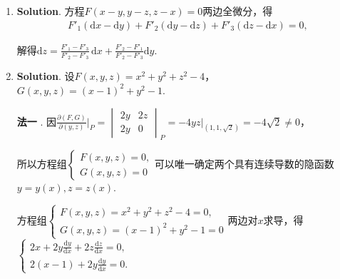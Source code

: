 \documentclass[../Main.tex]{subfiles}
\begin{document}
\begin{enumerate}
          平行六面体$\overrightarrow{PQ}\boldsymbol{s}_{1}\boldsymbol{s}_{2}$的体积$V
              =\left|\overrightarrow{PQ}\cdot (\boldsymbol{s}_{1}\times \boldsymbol{s}_{2}
              )\right|=\left|
              \begin{vmatrix}
                  1 & 1  & 2 \\
                  1 & -1 & 1 \\
                  1 & 3  & 4
              \end{vmatrix}\right|=2$，

          又$V=h\cdot |\boldsymbol{s}_{1}\times \boldsymbol{s}_{2}|$，其中$h$为两直线之间的距离，所以$h
              =\frac{V}{|\boldsymbol{s}_{1}\times \boldsymbol{s}_{2}|}=\frac{2}{2\sqrt{3}}
              =\frac{\sqrt{3}}{3}$.

    \item \textbf{Solution}. 方程$F(x-y,y-z,z-x)=0$两边全微分，得
          \[
              \begin{aligned}
                  F'_{1}\left(\mathrm{d}x-\mathrm{d}y\right) + F'_{2}\left(\mathrm{d}y-\mathrm{d}z\right) + F'_{3}\left(\mathrm{d}z-\mathrm{d}x\right) = 0,
              \end{aligned}
          \]

          解得$\mathrm{d}z = \frac{F'_{1}-F'_{3}}{F'_{2}-F'_{3}}\,\mathrm{d}x + \frac{F'_{2}-F'_{1}}{F'_{2}-F'_{3}}
              \mathrm{d}y$.

    \item \textbf{Solution}. 设$F(x,y,z) = x^{2}+y^{2}+z^{2}-4$，$G(x,y,z)=(x-1)^{2}
              +y^{2}-1$.

          \textbf{法一} . 因$\frac{\partial (F,G)}{\partial (y,z)}\bigg|_{P}=
              \begin{vmatrix}
                  2y & 2z \\
                  2y & 0
              \end{vmatrix}_{P}=\left.-4yz\right|_{\left(1,1,\sqrt{2}\right)}=-4\sqrt{2}\neq
              0$，

          所以方程组$\begin{cases}
                  F(x,y,z)=0, \\
                  G(x,y,z)=0
              \end{cases}$可以唯一确定两个具有连续导数的隐函数$y=y(x),z=z(x)$.

          方程组$\begin{cases}
                  F(x,y,z) = x^{2}+y^{2}+z^{2}-4=0, \\
                  G(x,y,z)=(x-1)^{2}+y^{2}-1=0
              \end{cases}$两边对$x$求导，得 $\begin{cases}
                  2x+2y\frac{\mathrm{d}y}{\mathrm{d}x}+2z\frac{\mathrm{d}z}{\mathrm{d}x}= 0, \\
                  2(x-1)+2y\frac{\mathrm{d}y}{\mathrm{d}x}= 0.
              \end{cases}$


\end{enumerate}
\end{document}
